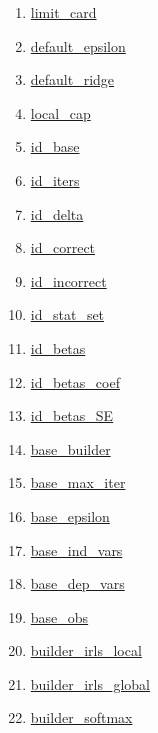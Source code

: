 \par
\par
\begin{enumerate}
\item \hyperlink{ecldoc:logisticregression.constants.limit_card}{limit\_card}
\item \hyperlink{ecldoc:logisticregression.constants.default_epsilon}{default\_epsilon}
\item \hyperlink{ecldoc:logisticregression.constants.default_ridge}{default\_ridge}
\item \hyperlink{ecldoc:logisticregression.constants.local_cap}{local\_cap}
\item \hyperlink{ecldoc:logisticregression.constants.id_base}{id\_base}
\item \hyperlink{ecldoc:logisticregression.constants.id_iters}{id\_iters}
\item \hyperlink{ecldoc:logisticregression.constants.id_delta}{id\_delta}
\item \hyperlink{ecldoc:logisticregression.constants.id_correct}{id\_correct}
\item \hyperlink{ecldoc:logisticregression.constants.id_incorrect}{id\_incorrect}
\item \hyperlink{ecldoc:logisticregression.constants.id_stat_set}{id\_stat\_set}
\item \hyperlink{ecldoc:logisticregression.constants.id_betas}{id\_betas}
\item \hyperlink{ecldoc:logisticregression.constants.id_betas_coef}{id\_betas\_coef}
\item \hyperlink{ecldoc:logisticregression.constants.id_betas_se}{id\_betas\_SE}
\item \hyperlink{ecldoc:logisticregression.constants.base_builder}{base\_builder}
\item \hyperlink{ecldoc:logisticregression.constants.base_max_iter}{base\_max\_iter}
\item \hyperlink{ecldoc:logisticregression.constants.base_epsilon}{base\_epsilon}
\item \hyperlink{ecldoc:logisticregression.constants.base_ind_vars}{base\_ind\_vars}
\item \hyperlink{ecldoc:logisticregression.constants.base_dep_vars}{base\_dep\_vars}
\item \hyperlink{ecldoc:logisticregression.constants.base_obs}{base\_obs}
\item \hyperlink{ecldoc:logisticregression.constants.builder_irls_local}{builder\_irls\_local}
\item \hyperlink{ecldoc:logisticregression.constants.builder_irls_global}{builder\_irls\_global}
\item \hyperlink{ecldoc:logisticregression.constants.builder_softmax}{builder\_softmax}
\end{enumerate}
